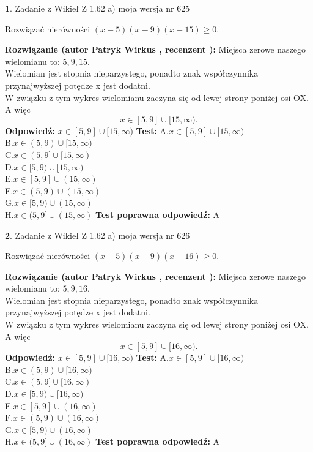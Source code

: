 \documentclass[12pt, a4paper]{article}
\theoremstyle{definition} %
\newtheorem{zad}{}
\newcommand{\zadStart}[1]{\begin{zad}#1\newline}
\newcommand{\zadStop}{\end{zad}}
\newcommand{\rozwStart}[2]{\noindent \textbf{Rozwiązanie (autor #1 , recenzent #2): }\newline}
\newcommand{\rozwStop}{\newline}
\newcommand{\odpStart}{\noindent \textbf{Odpowiedź:}\newline}
\newcommand{\odpStop}{\newline}
\newcommand{\testStart}{\noindent \textbf{Test:}\newline}
\newcommand{\testStop}{\newline}
\newcommand{\kluczStart}{\noindent \textbf{Test poprawna odpowiedź:}\newline}
\newcommand{\kluczStop}{\newline}
\begin{document}
\zadStart{Zadanie z Wikieł Z 1.62 a) moja wersja nr 625}

Rozwiązać nierówności $(x-5)(x-9)(x-15)\ge0$.
\zadStop
\rozwStart{Patryk Wirkus}{}
Miejsca zerowe naszego wielomianu to: $5, 9, 15$.\\
Wielomian jest stopnia nieparzystego, ponadto znak współczynnika przy\linebreak najwyższej potędze x jest dodatni.\\ W związku z tym wykres wielomianu zaczyna się od lewej strony poniżej osi OX. A więc $$x \in [5,9] \cup [15,\infty).$$
\rozwStop
\odpStart
$x \in [5,9] \cup [15,\infty)$
\odpStop
\testStart
A.$x \in [5,9] \cup [15,\infty)$\\
B.$x \in (5,9) \cup [15,\infty)$\\
C.$x \in (5,9] \cup [15,\infty)$\\
D.$x \in [5,9) \cup [15,\infty)$\\
E.$x \in [5,9] \cup (15,\infty)$\\
F.$x \in (5,9) \cup (15,\infty)$\\
G.$x \in [5,9) \cup (15,\infty)$\\
H.$x \in (5,9] \cup (15,\infty)$
\testStop
\kluczStart
A
\kluczStop



\zadStart{Zadanie z Wikieł Z 1.62 a) moja wersja nr 626}

Rozwiązać nierówności $(x-5)(x-9)(x-16)\ge0$.
\zadStop
\rozwStart{Patryk Wirkus}{}
Miejsca zerowe naszego wielomianu to: $5, 9, 16$.\\
Wielomian jest stopnia nieparzystego, ponadto znak współczynnika przy\linebreak najwyższej potędze x jest dodatni.\\ W związku z tym wykres wielomianu zaczyna się od lewej strony poniżej osi OX. A więc $$x \in [5,9] \cup [16,\infty).$$
\rozwStop
\odpStart
$x \in [5,9] \cup [16,\infty)$
\odpStop
\testStart
A.$x \in [5,9] \cup [16,\infty)$\\
B.$x \in (5,9) \cup [16,\infty)$\\
C.$x \in (5,9] \cup [16,\infty)$\\
D.$x \in [5,9) \cup [16,\infty)$\\
E.$x \in [5,9] \cup (16,\infty)$\\
F.$x \in (5,9) \cup (16,\infty)$\\
G.$x \in [5,9) \cup (16,\infty)$\\
H.$x \in (5,9] \cup (16,\infty)$
\testStop
\kluczStart
A
\kluczStop
\end{document}
